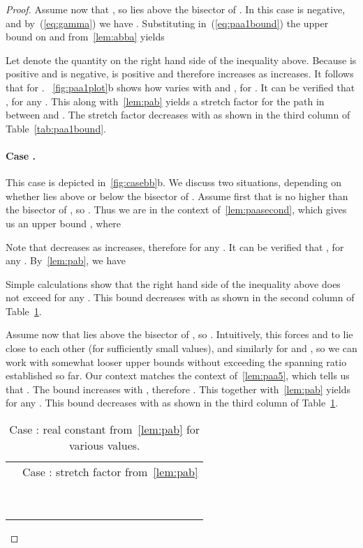 \documentclass[runningheads,a4paper]{llncs}
\begin{document}
\begin{proof}
Assume now that , so  lies above the bisector of . 
In this case  is negative, and by~(\ref{eq:gamma}) we have . Substituting in~(\ref{eq:paa1bound}) the upper bound on  and  from~\autoref{lem:abba} yields

Let  denote the quantity on the right hand side of the inequality above.  Because  is positive and  is negative,  is positive and therefore   increases as  increases. It follows that  for . ~\autoref{fig:paa1plot}b shows how  varies with  and , for . It can be verified that 
, for any .
This along with~\autoref{lem:pab} yields a stretch factor  for the path in  between  and . 
The stretch factor  decreases with  as shown in the third column of Table~\ref{tab:paa1bound}. 



\paragraph{Case .} This case is depicted in~\autoref{fig:casebb}b. We discuss two situations, depending on whether  lies above or below the bisector of . Assume first that  is no higher than the bisector of , so . Thus we are in the context of~\autoref{lem:paasecond}, which gives us an upper bound  
, where 

Note that  decreases as  increases, therefore  for any . It can be verified that , for any . 
By~\autoref{lem:pab}, we have 
 
Simple calculations show that the right hand side of the inequality above does not exceed  for any . This bound decreases with  as shown in the second column of Table~\ref{tab:paa2bound}. 

Assume now that  lies above the bisector of , so . Intuitively, this forces  and  to lie close to each other (for sufficiently small  values), and similarly for  and , so we can work with somewhat looser upper bounds without exceeding the spanning ratio established so far. Our context matches the context of~\autoref{lem:paa5}, which tells us that . The bound  increases with , therefore .  This together with~\autoref{lem:pab} yields 
 for any . 
This bound decreases with  as shown in the third column of Table~\ref{tab:paa2bound}. 




\begin{table}[hptb]
\begin{center}
\begin{tabular} {|c|c|c|}
\hline
\multirow{3}{*}{} & \multicolumn{2}{|c|}{Case : stretch factor  from~\autoref{lem:pab}} \\
\cline{2-3}
& ~~~~~~~~~~~~~~~~~~~ &  \\
\hline
 &  &  \\
 &  &  \\
 &  &  \\
 &  &  \\
\hline
\end{tabular}
\end{center}
\caption{Case : real constant  from~\autoref{lem:pab} for various  values.}
\label{tab:paa2bound}
\end{table}

\end{proof}
\end{document}
